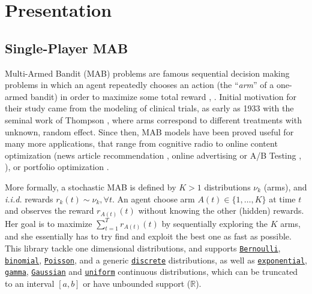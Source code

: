 \documentclass[a4paper,10pt,]{article}
\begin{document}

\section{Presentation}\label{presentation}

\subsection{Single-Player MAB}\label{single-player-mab}

Multi-Armed Bandit (MAB) problems are famous sequential decision
making problems in which an agent repeatedly chooses an action (the
``\emph{arm}'' of a one-armed bandit) in order to maximize some total
reward \citep{Robbins52}, \citep{LaiRobbins85}. Initial motivation for
their study came from the modeling of clinical trials, as early as 1933
with the seminal work of Thompson \citep{Thompson33}, where arms
correspond to different treatments with unknown, random effect. Since
then, MAB models have been proved useful for many more applications,
that range from cognitive radio \citep{Jouini09} to online content
optimization (news article recommendation \citep{Li10}, online
advertising \citep{LiChapelle11} or A/B Testing \citep{Kaufmann14},
\citep{Jamieson17}), or portfolio optimization \citep{Sani12}.


More formally, a stochastic MAB is defined by $K>1$ distributions $\nu_k$ (arms),
and \emph{i.i.d.} rewards $r_k(t) \sim \nu_k, \forall t$.
An agent choose arm $A(t)\in\{1,\dots,K\}$ at time $t$ and
observes the reward $r_{A(t)}(t)$ without knowing the other (hidden) rewards.
Her goal is to maximize $\sum_{t=1}^T r_{A(t)}(t)$ by sequentially exploring the $K$ arms,
and she essentially has to try find and exploit the best one as fast as possible.
This library tackle one dimensional distributions,
and supports \href{https://SMPyBandits.GitHub.io/docs/Arms.Bernoulli.html}{\texttt{Bernoulli}}, \href{https://SMPyBandits.GitHub.io/docs/Arms.Binomial.html}{\texttt{binomial}}, \href{https://SMPyBandits.GitHub.io/docs/Arms.Poisson.html}{\texttt{Poisson}}, and a generic \href{https://SMPyBandits.GitHub.io/docs/Arms.DiscreteArm.html}{\texttt{discrete}} distributions,
as well as \href{https://SMPyBandits.GitHub.io/docs/Arms.Exponential.html}{\texttt{exponential}}, \href{https://SMPyBandits.GitHub.io/docs/Arms.Gamma.html}{\texttt{gamma}}, \href{https://SMPyBandits.GitHub.io/docs/Arms.Gaussian.html}{\texttt{Gaussian}} and \href{https://SMPyBandits.GitHub.io/docs/Arms.Uniform.html}{\texttt{uniform}} continuous distributions,
which can be truncated to an interval $[a,b]$ or have unbounded support ($\mathbb{R}$).
\end{document}

